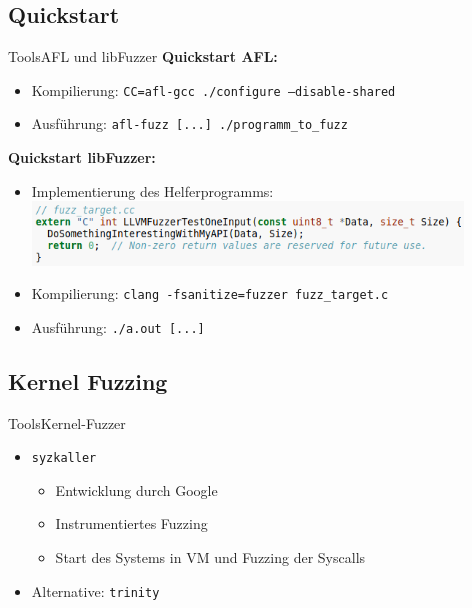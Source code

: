 \documentclass[ngerman,aspectratio=1610,12pt]{beamer}
\begin{document}
\subsection*{Quickstart}
\begin{frame}{Tools}{AFL und libFuzzer}
  \textbf{Quickstart  AFL:}
  \begin{itemize}
    \item Kompilierung:  \texttt{CC=afl-gcc ./configure --disable-shared}
    \item Ausführung: \texttt{afl-fuzz [...] ./programm\_to\_fuzz}
  \end{itemize}

  \textbf{Quickstart libFuzzer:}
  \begin{itemize}
    \item Implementierung des Helferprogramms: \includegraphics[width=0.9\textwidth]{images/libfuzz-quickstart}
    \item Kompilierung: \texttt{clang -fsanitize=fuzzer fuzz\_target.c}
    \item Ausführung: \texttt{./a.out [...]}
  \end{itemize}
\end{frame}




\subsection*{Kernel Fuzzing}
\begin{frame}{Tools}{Kernel-Fuzzer}
  \begin{itemize}
    \item \texttt{syzkaller}
    \begin{itemize}
      \item Entwicklung durch Google
      \item Instrumentiertes Fuzzing
      \item Start des Systems in VM und Fuzzing der Syscalls
    \end{itemize}
    \item Alternative: \texttt{trinity} 
  \end{itemize}
\end{frame}
\end{document}

